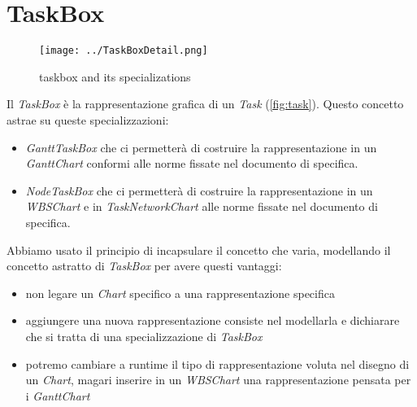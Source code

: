 \section{TaskBox}
\label{sec:taskbox}

\begin{figure}[h!] 
	\centering
	\texttt{[image: ../TaskBoxDetail.png]}
	\caption{taskbox and its specializations}
	\label{fig:taskbox} 
\end{figure}

Il \emph{TaskBox} \`e la rappresentazione grafica di un
\emph{Task} (\autoref{fig:task}). Questo concetto astrae su queste
specializzazioni:
\begin{itemize}
\item \emph{GanttTaskBox} che ci permetter\`a di costruire la rappresentazione
in un \emph{GanttChart} conformi alle norme fissate nel documento di specifica.

\item \emph{NodeTaskBox} che ci permetter\`a di costruire la rappresentazione
in un \emph{WBSChart} e in \emph{TaskNetworkChart} alle norme fissate nel 
documento di specifica.
\end{itemize}

Abbiamo usato il principio di incapsulare il concetto che varia, modellando il
concetto astratto di \emph{TaskBox} per avere questi vantaggi:
\begin{itemize}
  \item non legare un \emph{Chart} specifico a una rappresentazione specifica
  \item aggiungere una nuova rappresentazione consiste nel modellarla e
  dichiarare che si tratta di una specializzazione di \emph{TaskBox}
  \item potremo cambiare a runtime il tipo di rappresentazione voluta nel
  disegno di un \emph{Chart}, magari inserire in un \emph{WBSChart} una
  rappresentazione pensata per i \emph{GanttChart}
\end{itemize}